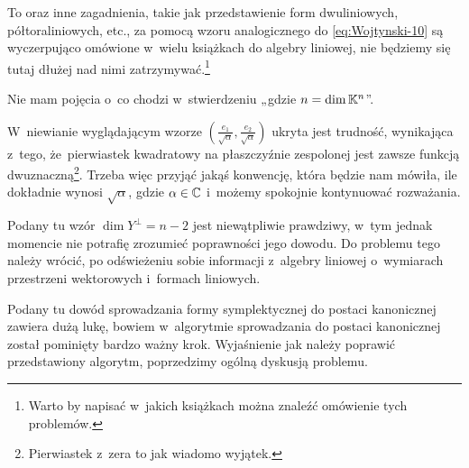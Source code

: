 \documentclass[a4paper,11pt]{article}
\begin{document}
To oraz inne zagadnienia, takie jak przedstawienie form dwuliniowych,
półtoraliniowych, etc., za pomocą wzoru analogicznego do
\eqref{eq:Wojtynski-10} są wyczerpująco omówione w~wielu książkach do
algebry liniowej, nie będziemy się tutaj dłużej nad nimi
zatrzymywać.\footnote{Warto by napisać w~jakich książkach można znaleźć
  omówienie tych problemów.}

\vspace{\spaceFour}




\start {} Nie mam pojęcia o~co chodzi w~stwierdzeniu
„gdzie $n = \dim \mathbb{K}^{ n }$”.

\vspace{\spaceFour}





\start {} W~niewianie wyglądającym wzorze $\left(
  \frac{ e_{ 1 } }{ \sqrt{ \alpha } }, \frac{ e_{ 2 } }{ \sqrt{ \alpha } } \right)$
ukryta jest trudność, wynikająca z~tego, że~pierwiastek kwadratowy na
płaszczyźnie zespolonej jest zawsze funkcją dwuznaczną\footnote{Pierwiastek
  z~zera to jak wiadomo wyjątek.}. Trzeba więc przyjąć jakąś konwencję,
która będzie nam mówiła, ile dokładnie wynosi $\sqrt{ \alpha }$, gdzie
$\alpha \in \mathbb{C}$ i~możemy spokojnie kontynuować rozważania.

\vspace{\spaceFour}





\start {} Podany tu wzór $\dim Y^{ \perp } = n - 2$ jest niewątpliwie
prawdziwy, w~tym jednak momencie nie potrafię zrozumieć poprawności jego
dowodu. Do problemu tego należy wrócić, po odświeżeniu sobie informacji
z~algebry liniowej o~wymiarach przestrzeni wektorowych i~formach liniowych.

\vspace{\spaceFour}



\start {} Podany tu dowód sprowadzania formy symplektycznej do
postaci kanonicznej zawiera dużą lukę, bowiem w~algorytmie sprowadzania do
postaci kanonicznej został pominięty bardzo ważny krok. Wyjaśnienie jak
należy poprawić przedstawiony algorytm, poprzedzimy ogólną dyskusją problemu.
\end{document}
